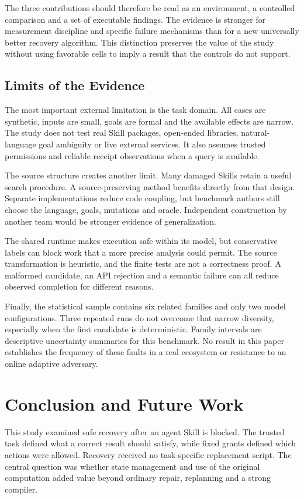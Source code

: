 \documentclass[conference]{IEEEtran}
\begin{document}
The three contributions should therefore be read as an environment, a controlled comparison and a set of executable findings. The evidence is stronger for measurement discipline and specific failure mechanisms than for a new universally better recovery algorithm. This distinction preserves the value of the study without using favorable cells to imply a result that the controls do not support.

\subsection{Limits of the Evidence}
The most important external limitation is the task domain. All cases are synthetic, inputs are small, goals are formal and the available effects are narrow. The study does not test real Skill packages, open-ended libraries, natural-language goal ambiguity or live external services. It also assumes trusted permissions and reliable receipt observations when a query is available.

The source structure creates another limit. Many damaged Skills retain a useful search procedure. A source-preserving method benefits directly from that design. Separate implementations reduce code coupling, but benchmark authors still choose the language, goals, mutations and oracle. Independent construction by another team would be stronger evidence of generalization.

The shared runtime makes execution safe within its model, but conservative labels can block work that a more precise analysis could permit. The source transformation is heuristic, and the finite tests are not a correctness proof. A malformed candidate, an API rejection and a semantic failure can all reduce observed completion for different reasons.

Finally, the statistical sample contains six related families and only two model configurations. Three repeated runs do not overcome that narrow diversity, especially when the first candidate is deterministic. Family intervals are descriptive uncertainty summaries for this benchmark. No result in this paper establishes the frequency of these faults in a real ecosystem or resistance to an online adaptive adversary.

\section{Conclusion and Future Work}
This study examined safe recovery after an agent Skill is blocked. The trusted task defined what a correct result should satisfy, while fixed grants defined which actions were allowed. Recovery received no task-specific replacement script. The central question was whether state management and use of the original computation added value beyond ordinary repair, replanning and a strong compiler.
\end{document}
